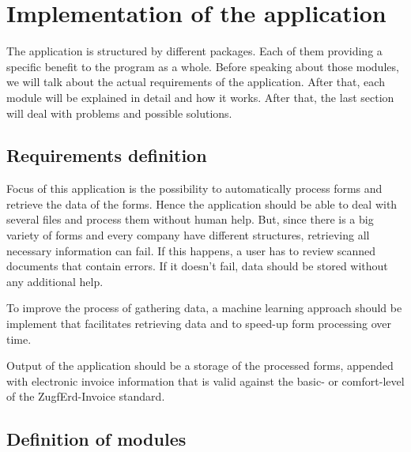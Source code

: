 %
% 
\chapter{Implementation of the application}
\label{cha5}

The application is structured by different packages. Each of them providing a specific benefit to the program as a whole. Before speaking about those modules, we will talk about the actual requirements of the application. After that, each module will be explained in detail and how it works. After that, the last section will deal with problems and possible solutions.

\section{Requirements definition}

Focus of this application is the possibility to automatically process forms and retrieve the data of the forms. Hence the application should be able to deal with several files and process them without human help. But, since there is a big variety of forms and every company have different structures, retrieving all necessary information can fail. If this happens, a user has to review scanned documents that contain errors. If it doesn't fail, data should be stored without any additional help.

To improve the process of gathering data, a machine learning approach should be implement that facilitates retrieving data and to speed-up form processing over time.

Output of the application should be a storage of the processed forms, appended with electronic invoice information that is valid against the basic- or comfort-level of the ZugfErd-Invoice standard.

\section{Definition of modules}

